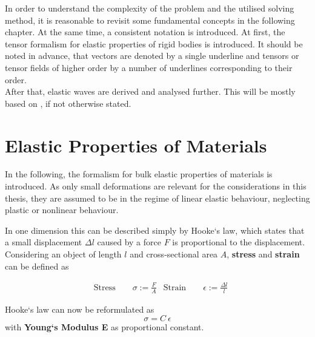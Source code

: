 In order to understand the complexity of the problem and the
utilised solving method, it is reasonable to revisit some fundamental concepts
in the following chapter. At the same time, a consistent notation is
introduced. At first, the tensor formalism for elastic properties
of rigid bodies is introduced. It should be noted in advance, that vectors are
denoted by a single underline and tensors or
tensor fields of higher order by a number of underlines corresponding to their
order. \\ After that, elastic waves are derived and analysed
further. This will be mostly based on \cite{GrossMarx2014}, if not otherwise
stated.

\section{Elastic Properties of Materials}
In the following, the formalism for bulk elastic properties of materials is
introduced. As only small deformations are relevant for the considerations in
this thesis, they are assumed to be in the regime of linear elastic behaviour,
neglecting plastic or nonlinear behaviour.

In one dimension this can be described simply by Hooke`s law, which states
that a small displacement $\Delta l$ caused by a force $F$ is
proportional to the displacement. Considering an object of length $l$ and
cross-sectional area $A$, \textbf{stress} and \textbf{strain} can be defined as

\begin{align}
     & \text{Stress} \quad \quad \sigma := \frac{F}{A}
     & \text{Strain} \quad \quad \epsilon := \frac{\Delta l}{l}
\end{align}

Hooke`s law can now be reformulated as
\begin{equation}
    \label{eq:HookStress1D}
    \sigma = C\ \epsilon
\end{equation}
with \textbf{Young`s Modulus E} as proportional constant.

